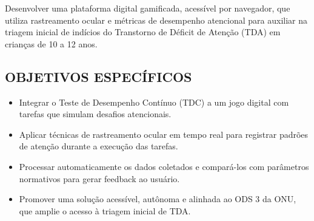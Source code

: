 Desenvolver uma plataforma digital gamificada, acessível por navegador, que utiliza
rastreamento ocular e métricas de desempenho atencional para auxiliar na triagem inicial de
indícios do Transtorno de Déficit de Atenção (TDA) em crianças de 10 a 12 anos.

\subsection*{OBJETIVOS ESPECÍFICOS} 

\begin{itemize}
    \item Integrar o Teste de Desempenho Contínuo (TDC) a um jogo digital com tarefas que
    simulam desafios atencionais.
    \item  Aplicar técnicas de rastreamento ocular em tempo real para registrar padrões de
    atenção durante a execução das tarefas.
    \item Processar automaticamente os dados coletados e compará-los com parâmetros
    normativos para gerar feedback ao usuário.
    \item Promover uma solução acessível, autônoma e alinhada ao ODS 3 da ONU, que amplie
    o acesso à triagem inicial de TDA.
\end{itemize}
